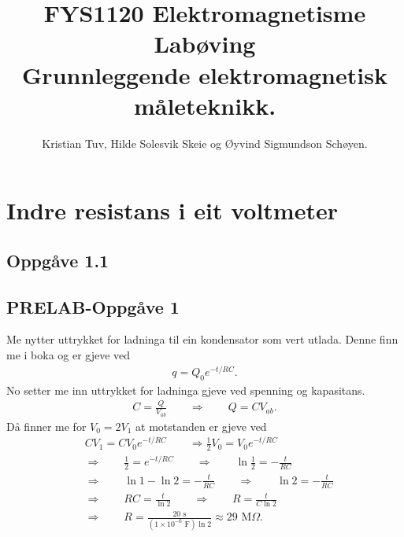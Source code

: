 \documentclass[11pt, a4paper]{article}
\begin{document}
\begin{titlepage}

  \title{\normalsize FYS1120 Elektromagnetisme\\
    \vspace{10mm}
    \huge Labøving\\
    \vspace{10mm}
    \normalsize{\bf Grunnleggende elektromagnetisk måleteknikk.}}

  \author{Kristian Tuv, Hilde Solesvik Skeie og Øyvind Sigmundson Schøyen.}

\end{titlepage}

\maketitle

\newpage
  \tableofcontents
\newpage

\section*{Indre resistans i eit voltmeter}

  \subsection*{Oppgåve 1.1}

  \subsection*{PRELAB-Oppgåve 1}
    Me nytter uttrykket for ladninga til ein kondensator som vert utlada. Denne finn me i boka og er gjeve ved
    \begin{align*}
      q = Q_0e^{-t/RC}.
    \end{align*}
    No setter me inn uttrykket for ladninga gjeve ved spenning og kapasitans.
    \begin{align*}
      C = \frac{Q}{V_{ab}} \qquad \Rightarrow \qquad Q = CV_{ab}.
    \end{align*}
    Då finner me for $V_0 = 2V_1$ at motstanden er gjeve ved
    \begin{align*}
      &CV_1 = CV_0e^{-t/RC} \qquad \Rightarrow \frac{1}{2}V_0 = V_0e^{-t/RC} \\
      &\Rightarrow \qquad \frac{1}{2} = e^{-t/RC} \qquad \Rightarrow \qquad \ln{\frac{1}{2}} = -\frac{t}{RC} \\
      &\Rightarrow \qquad \ln{1} - \ln{2} = -\frac{t}{RC} \qquad \Rightarrow \qquad \ln{2} = -\frac{t}{RC} \\
      &\Rightarrow \qquad RC = \frac{t}{\ln{2}} \qquad \Rightarrow \qquad R = \frac{t}{C\ln{2}} \\
      &\Rightarrow \qquad R = \frac{20\text{ s}}{(1\times10^{-6}\text{ F})\ln{2}} \approx 29\text{ M}\Omega.
    \end{align*}
\end{document}
